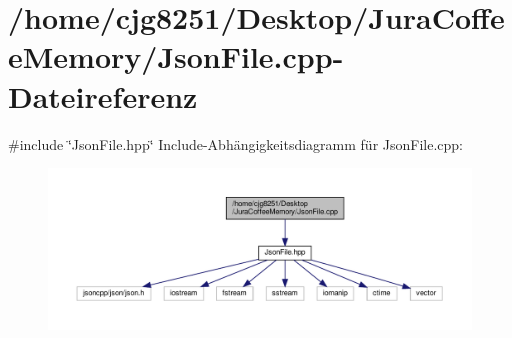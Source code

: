 \section{/home/cjg8251/\+Desktop/\+Jura\+Coffee\+Memory/\+Json\+File.cpp-\/\+Dateireferenz}
\label{_json_file_8cpp}
{\ttfamily \#include \char`\"{}Json\+File.\+hpp\char`\"{}}\newline
Include-\/\+Abhängigkeitsdiagramm für Json\+File.\+cpp\+:\nopagebreak
\begin{figure}[H]
\begin{center}
\leavevmode
\includegraphics[width=350pt]{_json_file_8cpp__incl}
\end{center}
\end{figure}
